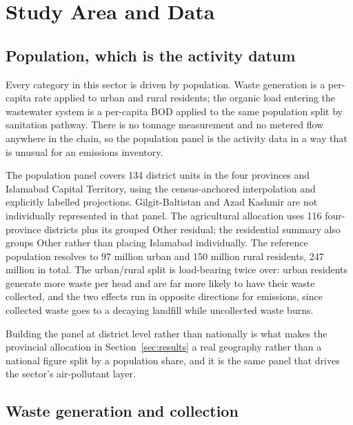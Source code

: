 \section{Study Area and Data}
\label{sec:data}

\subsection{Population, which is the activity datum}

Every category in this sector is driven by population. Waste generation is a per-capita rate
applied to urban and rural residents; the organic load entering the wastewater system is a
per-capita BOD applied to the same population split by sanitation pathway. There is no
tonnage measurement and no metered flow anywhere in the chain, so the population panel is the
activity data in a way that is unusual for an emissions inventory.

The population panel covers \num{134} district units in the four provinces and
Islamabad Capital Territory, using the census-anchored interpolation and explicitly
labelled projections. Gilgit-Baltistan and Azad Kashmir are not individually represented
in that panel. The agricultural allocation uses \num{116} four-province districts
plus its grouped Other residual; the residential summary also groups Other rather
than placing Islamabad individually. The reference population resolves to
\SI{97}{} million urban and \SI{150}{} million rural residents, \SI{247}{} million in total.
The urban/rural split is load-bearing twice over: urban residents generate more waste per head
and are far more likely to have their waste collected, and the two effects run in opposite
directions for emissions, since collected waste goes to a decaying landfill while uncollected
waste burns.

Building the panel at district level rather than nationally is what makes the provincial
allocation in Section~\ref{sec:results} a real geography rather than a national figure split
by a population share, and it is the same panel that drives the sector's air-pollutant layer.

\subsection{Waste generation and collection}

